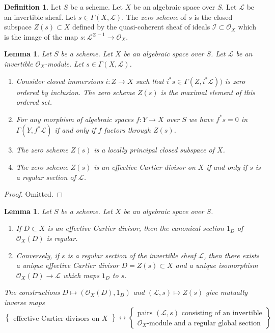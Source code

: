 \documentclass{stacks-project}
\theoremstyle{plain}
\newtheorem{lemma}[subsection]{Lemma}
\theoremstyle{definition}
\newtheorem{definition}[subsection]{Definition}
\theoremstyle{remark}
\numberwithin{equation}{subsection}
\begin{document}
\begin{definition}
\label{definition-zero-scheme-s}
Let $S$ be a scheme. Let $X$ be an algebraic space over $S$.
Let $\mathcal{L}$ be an invertible sheaf.
Let $s \in \Gamma(X, \mathcal{L})$.
The {\it zero scheme} of $s$ is the closed subspace $Z(s) \subset X$
defined by the quasi-coherent sheaf of ideals
$\mathcal{I} \subset \mathcal{O}_X$ which is the image of the
map $s : \mathcal{L}^{\otimes -1} \to \mathcal{O}_X$.
\end{definition}

\begin{lemma}
\label{lemma-zero-scheme}
Let $S$ be a scheme. Let $X$ be an algebraic space over $S$.
Let $\mathcal{L}$ be an invertible $\mathcal{O}_X$-module.
Let $s \in \Gamma(X, \mathcal{L})$.
\begin{enumerate}
\item Consider closed immersions $i : Z \to X$ such that
$i^*s \in \Gamma(Z, i^*\mathcal{L}))$ is zero
ordered by inclusion. The zero scheme $Z(s)$ is the
maximal element of this ordered set.
\item For any morphism of algebraic spaces $f : Y \to X$ over $S$
we have $f^*s = 0$ in $\Gamma(Y, f^*\mathcal{L})$ if and only if
$f$ factors through $Z(s)$.
\item The zero scheme $Z(s)$ is a locally principal closed subspace of $X$.
\item The zero scheme $Z(s)$ is an effective Cartier divisor on $X$
if and only if $s$ is a regular section of $\mathcal{L}$.
\end{enumerate}
\end{lemma}

\begin{proof}
Omitted.
\end{proof}

\begin{lemma}
\label{lemma-characterize-OD}
Let $S$ be a scheme. Let $X$ be an algebraic space over $S$.
\begin{enumerate}
\item If $D \subset X$ is an effective Cartier divisor, then
the canonical section $1_D$ of $\mathcal{O}_X(D)$ is regular.
\item Conversely, if $s$ is a regular section of the invertible
sheaf $\mathcal{L}$, then there exists a unique effective
Cartier divisor $D = Z(s) \subset X$ and a unique isomorphism
$\mathcal{O}_X(D) \to \mathcal{L}$ which maps $1_D$ to $s$.
\end{enumerate}
The constructions
$D \mapsto (\mathcal{O}_X(D), 1_D)$ and $(\mathcal{L}, s) \mapsto Z(s)$
give mutually inverse maps
$$
\left\{
\begin{matrix}
\text{effective Cartier divisors on }X
\end{matrix}
\right\}
\leftrightarrow
\left\{
\begin{matrix}
\text{pairs }(\mathcal{L}, s)\text{ consisting of an invertible}\\
\mathcal{O}_X\text{-module and a regular global section}
\end{matrix}
\right\}
$$
\end{lemma}
\end{document}
